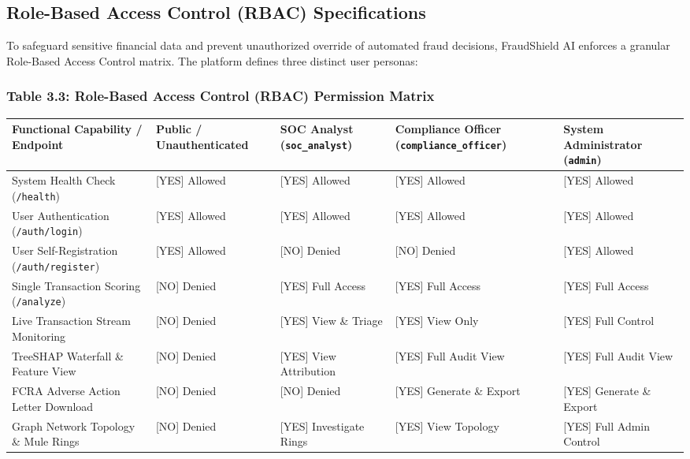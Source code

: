 \documentclass[12pt,a4paper,oneside]{report}
\begin{document}
\subsection{Role-Based Access Control (RBAC) Specifications}

To safeguard sensitive financial data and prevent unauthorized override of automated fraud decisions, FraudShield AI enforces a granular Role-Based Access Control matrix. The platform defines three distinct user personas:


\subsubsection{Table 3.3: Role-Based Access Control (RBAC) Permission Matrix}

\begin{table}[H]
\centering
\footnotesize
\begin{adjustbox}{width=\textwidth,center}
\begin{tabular}{| l | l | l | l | l |}
\hline
\rowcolor{tableheader} \textbf{Functional Capability / Endpoint} & \textbf{Public / Unauthenticated} & \textbf{SOC Analyst (\texttt{soc\_analyst})} & \textbf{Compliance Officer (\texttt{compliance\_officer})} & \textbf{System Administrator (\texttt{admin})} \\ \hline
System Health Check (\texttt{/health}) & [YES] Allowed & [YES] Allowed & [YES] Allowed & [YES] Allowed \\ \hline
\rowcolor{tablealt} User Authentication (\texttt{/auth/login}) & [YES] Allowed & [YES] Allowed & [YES] Allowed & [YES] Allowed \\ \hline
User Self-Registration (\texttt{/auth/register}) & [YES] Allowed & [NO] Denied & [NO] Denied & [YES] Allowed \\ \hline
\rowcolor{tablealt} Single Transaction Scoring (\texttt{/analyze}) & [NO] Denied & [YES] Full Access & [YES] Full Access & [YES] Full Access \\ \hline
Live Transaction Stream Monitoring & [NO] Denied & [YES] View \& Triage & [YES] View Only & [YES] Full Control \\ \hline
\rowcolor{tablealt} TreeSHAP Waterfall \& Feature View & [NO] Denied & [YES] View Attribution & [YES] Full Audit View & [YES] Full Audit View \\ \hline
FCRA Adverse Action Letter Download & [NO] Denied & [NO] Denied & [YES] Generate \& Export & [YES] Generate \& Export \\ \hline
\rowcolor{tablealt} Graph Network Topology \& Mule Rings & [NO] Denied & [YES] Investigate Rings & [YES] View Topology & [YES] Full Admin Control \\ \hline

\end{tabular}
\end{adjustbox}
\end{table}
\end{document}
